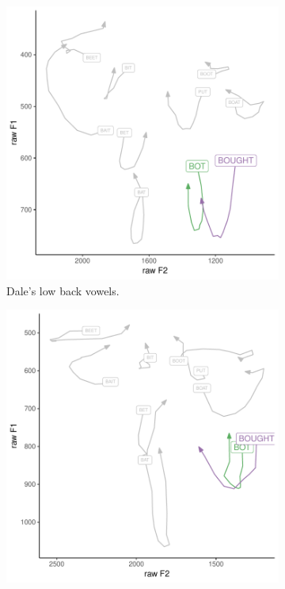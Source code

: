 \begin{figure}[tb!]
    \centering
    \hspace{\fill}
     \begin{subfigure}[t]{2.925in}
        \centering
        \includegraphics[width = \textwidth]{Figures/example_plots/09-Dale_avg_lowback.pdf}
        \caption{Dale's low back vowels.}
        \label{fig:dale_low_back}
    \end{subfigure}
    \hspace{\fill}
    \begin{subfigure}[t]{2.925in}
        \centering
        \includegraphics[width = \textwidth]{Figures/example_plots/14-Jessica_avg_lowback.pdf}

\end{subfigure}
\end{figure}
